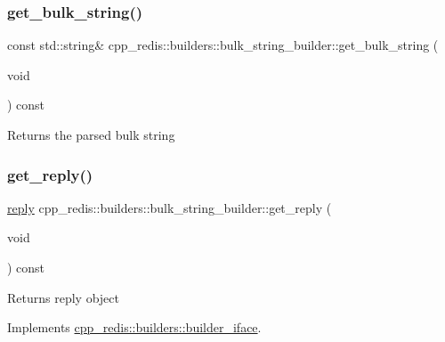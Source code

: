 \subsubsection{\texorpdfstring{get\+\_\+bulk\+\_\+string()}{get\_bulk\_string()}}
{\footnotesize\ttfamily const std\+::string\& cpp\+\_\+redis\+::builders\+::bulk\+\_\+string\+\_\+builder\+::get\+\_\+bulk\+\_\+string (\begin{DoxyParamCaption}\item[{void}]{ }\end{DoxyParamCaption}) const}

\begin{DoxyReturn}{Returns}
the parsed bulk string 
\end{DoxyReturn}
\mbox{\label{classcpp__redis_1_1builders_1_1bulk__string__builder_a56d6d3089107a1bccd63f6a5267c16cb}} 
\subsubsection{\texorpdfstring{get\+\_\+reply()}{get\_reply()}}
{\footnotesize\ttfamily \hyperlink{classcpp__redis_1_1reply}{reply} cpp\+\_\+redis\+::builders\+::bulk\+\_\+string\+\_\+builder\+::get\+\_\+reply (\begin{DoxyParamCaption}\item[{void}]{ }\end{DoxyParamCaption}) const\hspace{0.3cm}{\ttfamily [virtual]}}

\begin{DoxyReturn}{Returns}
reply object 
\end{DoxyReturn}


Implements \hyperlink{classcpp__redis_1_1builders_1_1builder__iface_afd2ff2c2371c2a486116543b638b9413}{cpp\+\_\+redis\+::builders\+::builder\+\_\+iface}.

\mbox{\label{classcpp__redis_1_1builders_1_1bulk__string__builder_a2a6ab893dbe5ad2433df18ce62ca6211}} 
